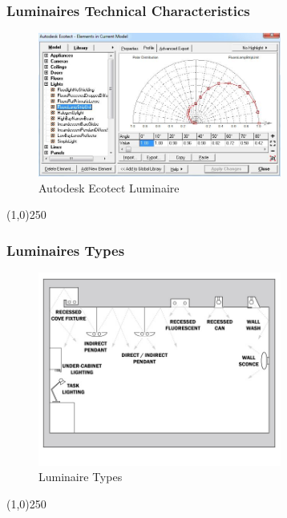\begin{frame}
\frametitle{Luminaires \hfill\hfill Technical Characteristics}
\begin{figure}
	\centering
		\includegraphics[width=8cm]{../img/lumTechSpec.jpg}
	\caption{Autodesk Ecotect Luminaire}
	\label{fig:lumTechSpec}
\end{figure}
\end{frame}
\begin{center}\line(1,0){250}\end{center}


\begin{frame}
\frametitle{Luminaires \hfill\hfill Types}
\begin{figure}
	\centering
		\includegraphics[width=8cm]{../img/lightingtypes.jpg}
	\caption{Luminaire Types}
	\label{fig:lightingtypes}
\end{figure}

\end{frame}
\begin{center}\line(1,0){250}\end{center}




